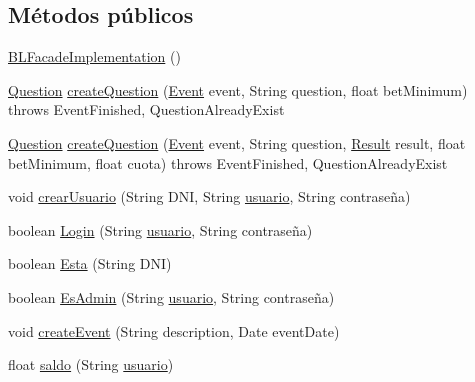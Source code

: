 \subsection*{Métodos públicos}
\begin{DoxyCompactItemize}
\item 
\mbox{\hyperlink{classbusinessLogic_1_1BLFacadeImplementation_a5888a8388b131051ab729d6a326d9414}{B\+L\+Facade\+Implementation}} ()
\item 
\mbox{\hyperlink{classdomain_1_1Question}{Question}} \mbox{\hyperlink{classbusinessLogic_1_1BLFacadeImplementation_ab033eb5a41a86e8b3010455b745ba267}{create\+Question}} (\mbox{\hyperlink{classdomain_1_1Event}{Event}} event, String question, float bet\+Minimum)  throws Event\+Finished, Question\+Already\+Exist
\item 
\mbox{\hyperlink{classdomain_1_1Question}{Question}} \mbox{\hyperlink{classbusinessLogic_1_1BLFacadeImplementation_a05d93749b9cdaabcda23a8e6299fdf7d}{create\+Question}} (\mbox{\hyperlink{classdomain_1_1Event}{Event}} event, String question, \mbox{\hyperlink{classdomain_1_1Result}{Result}} result, float bet\+Minimum, float cuota)  throws Event\+Finished, Question\+Already\+Exist
\item 
void \mbox{\hyperlink{classbusinessLogic_1_1BLFacadeImplementation_a2127be166dc2d3c992f3435006ab0575}{crear\+Usuario}} (String D\+NI, String \mbox{\hyperlink{classbusinessLogic_1_1BLFacadeImplementation_ab32bba3f140f33d176c85bb4ad8527b4}{usuario}}, String contraseña)
\item 
boolean \mbox{\hyperlink{classbusinessLogic_1_1BLFacadeImplementation_afa698129a017866dfc8ae32601fd00fe}{Login}} (String \mbox{\hyperlink{classbusinessLogic_1_1BLFacadeImplementation_ab32bba3f140f33d176c85bb4ad8527b4}{usuario}}, String contraseña)
\item 
boolean \mbox{\hyperlink{classbusinessLogic_1_1BLFacadeImplementation_ac83572a35820cc3eac9d4a51add5a752}{Esta}} (String D\+NI)
\item 
boolean \mbox{\hyperlink{classbusinessLogic_1_1BLFacadeImplementation_a1fd11ce02084c04c70d667efb94167d0}{Es\+Admin}} (String \mbox{\hyperlink{classbusinessLogic_1_1BLFacadeImplementation_ab32bba3f140f33d176c85bb4ad8527b4}{usuario}}, String contraseña)
\item 
void \mbox{\hyperlink{classbusinessLogic_1_1BLFacadeImplementation_a504f1b6069b3d166881c8047836a1d76}{create\+Event}} (String description, Date event\+Date)
\item 
float \mbox{\hyperlink{classbusinessLogic_1_1BLFacadeImplementation_a2ba616628033f05a5f70a0afddb1c970}{saldo}} (String \mbox{\hyperlink{classbusinessLogic_1_1BLFacadeImplementation_ab32bba3f140f33d176c85bb4ad8527b4}{usuario}})

\end{DoxyCompactItemize}
